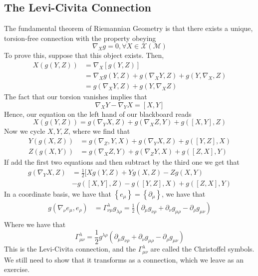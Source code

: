 \subsection{The Levi-Civita Connection} 
The fundamental theorem of Riemannian 
Geometry is that there exists a unique, 
torsion-free connection with the property 
obeying 
\[
	\nabla _ X g = 0 , \forall X \in \mathcal{ X } ( \mathcal{ M } ) 
\]
To prove this, suppose that this object exists. 
Then, 
\begin{align*}
	X ( g ( Y , Z ) ) &=  \nabla _ X [ g ( Y , Z ) ]  \\
			  &=  \nabla _ X g ( Y , Z ) + g ( \nabla _ X Y , Z ) + g ( Y , \nabla _X , Z )  \\
			  &=  g ( \nabla _ X Y , Z ) + g ( Y , \nabla _ X  Z )  
\end{align*}
The fact that our torsion vanishes implies 
that 
\[
	\nabla  _ X Y - \nabla _ Y X = [ X, Y ] 
\] Hence, our equation on the left hand of 
our blackboard reads 
\[
	X ( g ( Y ,Z ) ) = g ( \nabla _ Y X , Z ) + g ( \nabla _ X Z , Y ) + g ( [ X, Y ] , Z ) 
\] Now we cycle $ X, Y , Z $, where we find that 
\begin{align*}
	Y ( g ( X, Z ) ) & = g ( \nabla _ Z , Y , X ) + g ( \nabla _ Y X , Z )  + g ( [ Y , Z] , X ) \\
	Z ( g ( X, Y ) ) &=  g ( \nabla _ X Z , Y ) + g ( \nabla _ Z Y , X ) + g ( [ Z, X] , Y ) 
\end{align*}
If add the first two equations and 
then subtract by the third one we get that 
\begin{align*} 
	g ( \nabla _ Y X , Z ) &= \frac{1}{2 } \big [  X g ( Y , Z ) + Y g ( X, Z ) - Z g ( X, Y )  \\
		 & - g ( [ X, Y ] , Z ) - g ( [ Y , Z ] , X ) + g ( [ Z, X ] , Y ) 
\end{align*} 
In a coordinate basis, we have
that $ \left\{  e_ \mu  \right\}   = \left\{  \partial _ \mu  \right\} $, we 
have that 
\begin{align*}
	g ( \nabla _ \nu e _ \mu , e _ \rho ) &=  \Gamma ^ \lambda _{ \nu \mu } g _{ \lambda \rho } = 
	\frac{1}{2 } ( \partial _ \mu g _{ \nu \rho } + \partial  _ \nu g _{ \mu \rho }  - \partial  _ \rho 
	g _{ \mu \nu } ) \\
\end{align*} 
Where we have that 
\[
	\Gamma ^ \lambda _{ \mu \nu } = \frac{1}{2 } g ^{ \lambda \rho } ( \partial  _ \mu g _{ \nu \rho } + \partial  _ \nu g _{ \mu \rho } - \partial  _ \rho g _{ \mu \nu } ) 
\] 
This is the Levi-Civita connection, 
and the $ \Gamma ^ \lambda _{ \mu \nu } $ are called 
the Christoffel symbols. 
We still need to show that it transforms as a connection, 
which we leave as an exercise.

